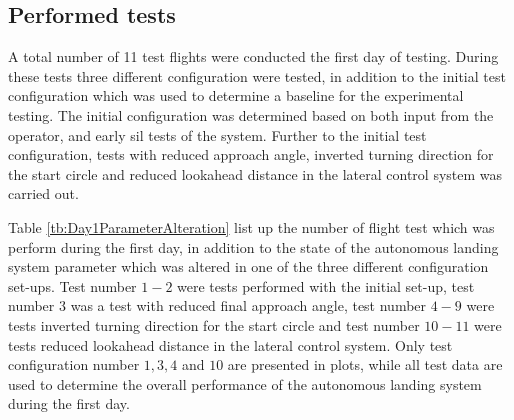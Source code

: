 \subsection{Performed tests}
A total number of 11 test flights were conducted the first day of testing. During these tests three different configuration were tested, in addition to the initial test configuration which was used to determine a baseline for the experimental testing. The initial configuration was determined based on both input from the operator, and early \gls{sil} tests of the system. Further to the initial test configuration, tests with reduced approach angle, inverted turning direction for the start circle and reduced lookahead distance in the lateral control system was carried out.

Table \ref{tb:Day1ParameterAlteration} list up the number of flight test which was perform during the first day, in addition to the state of the autonomous landing system parameter which was altered in one of the three different configuration set-ups. Test number $1-2$ were tests performed with the initial set-up, test number $3$ was a test with reduced final approach angle, test number $4-9$ were tests inverted turning direction for the start circle and test number $10-11$ were tests reduced lookahead distance in the lateral control system.  Only test configuration number $1,3,4$ and $10$ are presented in plots, while all test data are used to determine the overall performance of the autonomous landing system during the first day.
\newpage
